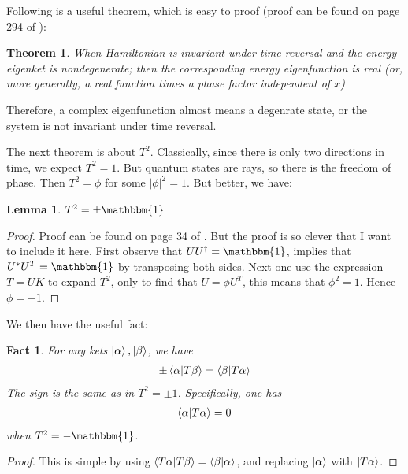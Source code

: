 \documentclass{article}
\numberwithin{equation}{subsection} %
\newtheorem{thm}{Theorem}[section]
\newtheorem{lemma}{Lemma}[section]
\newtheorem{fact}{Fact}[section]
\theoremstyle{definition}
\begin{document}
    Following is a useful theorem, which is easy to proof (proof can be
    found on page 294 of \cite{sakurai}):
    \begin{thm}
        \label{thm:TRoper.fromCM2QM.TR_nondegen_real}
        When Hamiltonian is invariant under time reversal and the energy
        eigenket is nondegenerate; then the corresponding energy
        eigenfunction is real (or, more generally, a real function times a
        phase factor independent of $x$)
    \end{thm}
    Therefore, a complex eigenfunction almost means a degenrate state, or
    the system is not invariant under time reversal.
    
    The next theorem is about $T^2$. Classically, since there is only
    two directions in time, we expect $T^2=1$. But quantum states are
    rays, so there is the freedom of phase. Then $T^2 = \phi$ for
    some $|\phi|^2=1$. But better, we have:
    
    \begin{lemma}
        $T^2 = \pm \mathbbm{1}$
    \end{lemma}
    \begin{proof}
        Proof can be found on page 34 of \cite{bernevig}. But the proof is
        so clever that I want to include it here. First observe that 
        $U U^\dagger = \mathbbm{1}$, implies that $U^* U^T = \mathbbm{1}$
        by transposing both sides. Next one use the expression $T=UK$ to
        expand $T^2$, only to find that $U=\phi U^T$, this means that
        $\phi^2=1$. Hence $\phi=\pm 1$.
    \end{proof}

    We then have the useful fact:
    \begin{fact}
        \label{fact:TROperator_TRInSpin_InnerProdTUandU}
        For any kets $\ket{\alpha},\ket{\beta}$, we have
        \begin{align}
            \pm \braket{\alpha|T\beta} = 
                \braket{\beta|T\alpha}
        \end{align}
        The sign is the same as in $T^2=\pm 1$. Specifically, one has
        \begin{align}
            \braket{\alpha |T \alpha} = 0
        \end{align}
        when $T^2= -\mathbbm{1}$.
    \end{fact}
    \begin{proof}
        This is simple by using 
        $\braket{T\alpha|T\beta} = \braket{\beta|\alpha}$, 
        and replacing $\ket{\alpha}$ with $\ket{T \alpha}$.
    \end{proof}
\end{document}
